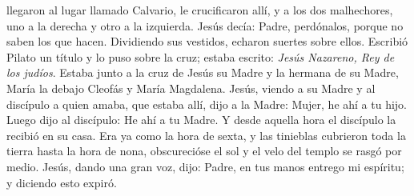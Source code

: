  llegaron al lugar llamado Calvario, le crucificaron allí, y a los dos malhechores, uno a la derecha y otro a la izquierda. Jesús decía:
Padre, perdónalos, porque no saben los que hacen. Dividiendo sus vestidos, echaron suertes sobre ellos. Escribió Pilato un título y lo puso sobre la cruz;
estaba escrito: \textit{Jesús Nazareno, Rey de los judíos}. Estaba junto a la cruz de Jesús su Madre y la hermana de su Madre, María la debajo Cleofás y María Magdalena.
Jesús, viendo a su Madre y al discípulo a quien amaba, que estaba allí, dijo a la Madre: Mujer, he ahí a tu hijo. Luego dijo al discípulo: He ahí a tu Madre.
Y desde aquella hora el discípulo la recibió en su casa. Era ya como la hora de sexta, y las tinieblas cubrieron toda la tierra hasta la hora de nona,
obscurecióse el sol y el velo del templo se rasgó por medio. Jesús, dando una gran voz, dijo: Padre, en tus manos entrego mi espíritu; y diciendo esto expiró.